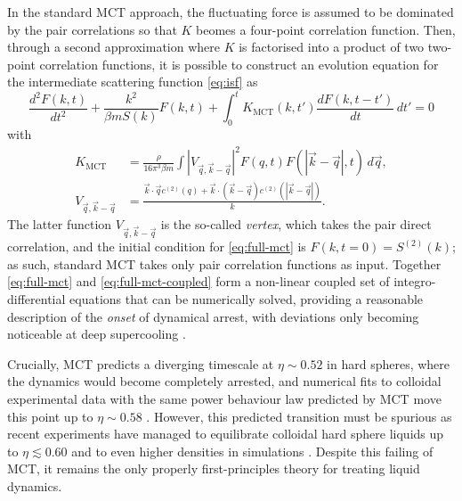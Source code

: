 \documentclass[11pt,twoside]{report}
\begin{document}
In the standard MCT approach, the fluctuating force is assumed to be dominated by the pair correlations so that $K$ beomes a four-point correlation function.
Then, through a second approximation where $K$ is factorised into a product of two two-point correlation functions, it is possible to construct an evolution equation for the intermediate scattering function \eqref{eq:isf} as \cite{ReichmanJSM2005}
\begin{equation}\label{eq:full-mct}
  \frac{d^2 F(k,t)}{d t^2}
  + \frac{k^2}{\beta m S(k)} F(k, t)
  + \int_0^t K_\mathrm{MCT}(k, t') \frac{d F(k, t - t')}{dt} \, dt'
  =
  0
\end{equation}
with
\begin{subequations}\label{eq:full-mct-coupled}
  \begin{align}
    K_\mathrm{MCT}
    &=
    \frac{\rho}{16 \pi^3 \beta m}
    \int |V_{\vec{q},\vec{k}-\vec{q}}|^2
    F(q, t) F(|\vec{k} - \vec{q}|, t)
    \, d\vec{q},
    \\
    V_{\vec{q},\vec{k}-\vec{q}}
    &=
    \frac{
      \vec{k} \cdot \vec{q} c^{(2)}(q) + \vec{k} \cdot (\vec{k} - \vec{q}) c^{(2)}(|\vec{k} - \vec{q}|)
    }{
      k
    }.
  \end{align}
\end{subequations}
The latter function $V_{\vec{q},\vec{k}-\vec{q}}$ is the so-called \emph{vertex}, which takes the pair direct correlation, and the initial condition for \eqref{eq:full-mct} is $F(k,t=0) = S^{(2)}(k)$; as such, standard MCT takes only pair correlation functions as input.
Together \eqref{eq:full-mct} and \eqref{eq:full-mct-coupled} form a non-linear coupled set of integro-differential equations that can be numerically solved, providing a reasonable description of the \emph{onset} of dynamical arrest, with deviations only becoming noticeable at deep supercooling \cite{FlennerPRE2011,BrambillaPRL2009}.

Crucially, MCT predicts a diverging timescale at $\eta \sim 0.52$ in hard spheres, where the dynamics would become completely arrested, and numerical fits to colloidal experimental data with the same power behaviour law predicted by MCT move this point up to $\eta \sim 0.58$ \cite{VanMegenPRE1994}.
However, this predicted transition must be spurious as recent experiments have managed to equilibrate colloidal hard sphere liquids up to $\eta \lesssim 0.60$ \cite{BrambillaPRL2009,HallettNC2018} and to even higher densities in simulations \cite{BerthierPRL2016}.
Despite this failing of MCT, it remains the only properly first-principles theory for treating liquid dynamics.
\end{document}
